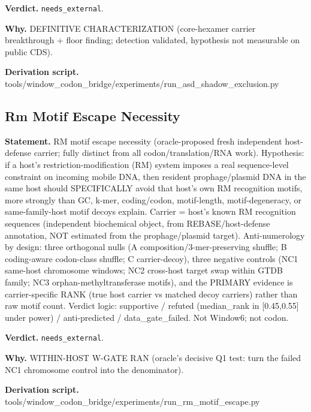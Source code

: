 \textbf{Verdict.} \texttt{needs\_external}.

\textbf{Why.} DEFINITIVE CHARACTERIZATION (core-hexamer carrier breakthrough + floor finding; detection validated,
hypothesis not measurable on public CDS).

\textbf{Derivation script.} tools/window\_codon\_bridge/experiments/run\_asd\_shadow\_exclusion.py

\subsection{Rm Motif Escape Necessity}\label{sec:bridge-rm-motif-escape-necessity}
\textbf{Statement.} RM motif escape necessity (oracle-proposed fresh independent host-defense carrier; fully distinct
from all codon/translation/RNA work). Hypothesis: if a host's restriction-modification (RM) system
imposes a real sequence-level constraint on incoming mobile DNA, then resident prophage/plasmid DNA
in the same host should SPECIFICALLY avoid that host's own RM recognition motifs, more strongly than
GC, k-mer, coding/codon, motif-length, motif-degeneracy, or same-family-host motif decoys explain.
Carrier = host's known RM recognition sequences (independent biochemical object, from
REBASE/host-defense annotation, NOT estimated from the prophage/plasmid target). Anti-numerology by
design: three orthogonal nulls (A composition/3-mer-preserving shuffle; B coding-aware codon-class
shuffle; C carrier-decoy), three negative controls (NC1 same-host chromosome windows; NC2 cross-host
target swap within GTDB family; NC3 orphan-methyltransferase motifs), and the PRIMARY evidence is
carrier-specific RANK (true host carrier vs matched decoy carriers) rather than raw motif count.
Verdict logic: supportive / refuted (median\_rank in [0.45,0.55] under power) / anti-predicted /
data\_gate\_failed. Not Window6; not codon.

\textbf{Verdict.} \texttt{needs\_external}.

\textbf{Why.} WITHIN-HOST W-GATE RAN (oracle's decisive Q1 test: turn the failed NC1 chromosome control into the
denominator).

\textbf{Derivation script.} tools/window\_codon\_bridge/experiments/run\_rm\_motif\_escape.py

